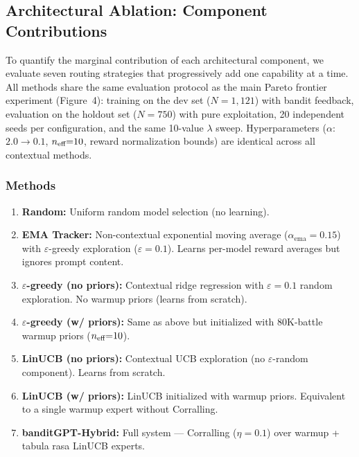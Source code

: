 
\subsection{Architectural Ablation: Component Contributions}
\label{appendix:architectural_ablation}

To quantify the marginal contribution of each architectural component, we
evaluate seven routing strategies that progressively add one capability at a
time.  All methods share the same evaluation protocol as the main Pareto
frontier experiment (Figure~4): training on the dev set ($N{=}1{,}121$) with
bandit feedback, evaluation on the holdout set ($N{=}750$) with pure
exploitation, 20 independent seeds per configuration, and the same 10-value
$\lambda$ sweep.  Hyperparameters ($\alpha$: $2.0 \to 0.1$, $n_{\text{eff}}{=}10$,
reward normalization bounds) are identical across all contextual methods.

\subsubsection{Methods}

\begin{enumerate}[leftmargin=*,noitemsep]
    \item \textbf{Random:} Uniform random model selection (no learning).
    \item \textbf{EMA Tracker:} Non-contextual exponential moving average
          ($\alpha_{\text{ema}}{=}0.15$) with $\varepsilon$-greedy exploration
          ($\varepsilon{=}0.1$). Learns per-model reward averages but ignores
          prompt content.
    \item \textbf{$\varepsilon$-greedy (no priors):} Contextual ridge
          regression with $\varepsilon{=}0.1$ random exploration.  No warmup
          priors (learns from scratch).
    \item \textbf{$\varepsilon$-greedy (w/ priors):} Same as above but
          initialized with 80K-battle warmup priors ($n_{\text{eff}}{=}10$).
    \item \textbf{LinUCB (no priors):} Contextual UCB exploration (no
          $\varepsilon$-random component). Learns from scratch.
    \item \textbf{LinUCB (w/ priors):} LinUCB initialized with warmup priors.
          Equivalent to a single warmup expert without Corralling.
    \item \textbf{banditGPT-Hybrid:} Full system --- Corralling ($\eta{=}0.1$)
          over warmup + tabula rasa LinUCB experts.
\end{enumerate}

